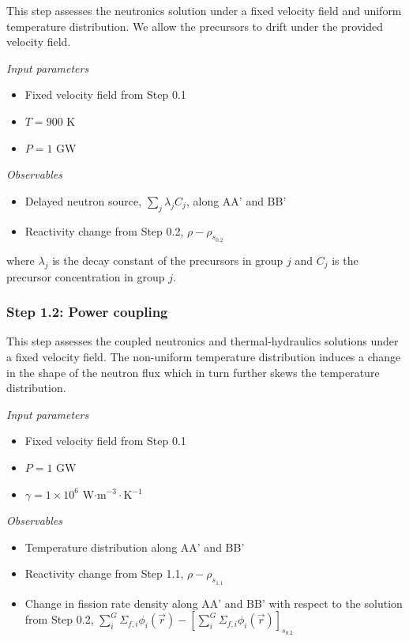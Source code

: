 This step assesses the neutronics solution under a fixed velocity field and
uniform temperature distribution. We allow the precursors to drift under the
provided velocity field.

\textit{Input parameters}
%
\begin{itemize}
    \itemsep0em
    \item Fixed velocity field from Step 0.1
    \item $T = 900$ K
    \item $P = 1$ GW
\end{itemize}

\textit{Observables}
\begin{itemize}
    \itemsep0em
    \item Delayed neutron source, $\sum_j \lambda_j C_j$, along AA' and BB'
    \item Reactivity change from Step 0.2, $\rho - \rho_{s_{0.2}}$
\end{itemize}
where $\lambda_j$ is the decay constant of the precursors in group $j$ and
$C_j$ is the precursor concentration in group $j$.

\subsubsection{Step 1.2: Power coupling}

This step assesses the coupled neutronics and thermal-hydraulics solutions
under a fixed velocity field. The non-uniform temperature distribution induces
a change in the shape of the neutron flux which in turn further skews the
temperature distribution.

\textit{Input parameters}
%
\begin{itemize}
    \itemsep0em
    \item Fixed velocity field from Step 0.1
    \item $P = 1$ GW
    \item $\gamma = 1 \times 10^6$ W$\cdot$m$^{-3}\cdot$K$^{-1}$
\end{itemize}

\textit{Observables}
\begin{itemize}
    \itemsep0em
    \item Temperature distribution along AA' and BB'
    \item Reactivity change from Step 1.1, $\rho - \rho_{s_{1.1}}$
    \item Change in fission rate density along AA' and BB' with respect to the
    solution from Step 0.2, $\sum^G_i \Sigma_{f,i} \phi_i(\vec{r}) -
    \left[\sum^G_i \Sigma_{f,i} \phi_i(\vec{r})\right]_{s_{0.2}}$
\end{itemize}

